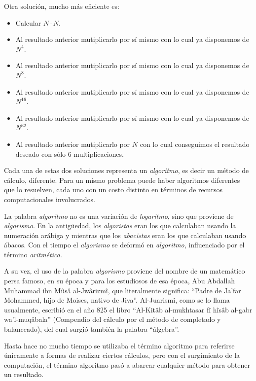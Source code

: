 Otra solución, mucho más eficiente es:
\begin{itemize}[noitemsep]
\item Calcular $N \cdot N$.

\item Al resultado anterior mutiplicarlo por sí mismo con lo cual
ya disponemos de $N^{4}$.

\item Al resultado anterior mutiplicarlo por sí mismo con lo cual
ya disponemos de $N^{8}$.

\item Al resultado anterior mutiplicarlo por sí mismo con lo cual
ya disponemos de $N^{16}$.

\item Al resultado anterior mutiplicarlo por sí mismo con lo cual
ya disponemos de $N^{32}$.

\item Al resultado anterior mutiplicarlo por $N$ con lo cual
conseguimos el resultado deseado con sólo 6 multiplicaciones.

\end{itemize}

Cada una de estas dos soluciones representa un \emph{algoritmo}, es
decir un método de cálculo, diferente. Para un mismo problema
puede haber algoritmos diferentes que lo resuelven, cada uno con
un costo distinto en términos de recursos computacionales
involucrados.

\begin{sabias_que}
La palabra \textit{algoritmo} no es una variación de \textit{logaritmo},
sino que proviene de \textit{algorismo}. En la antigüedad, los
\textit{algoristas} eran los que calculaban usando la numeración arábiga y
mientras que los \textit{abacistas} eran los que calculaban usando ábacos.
Con el tiempo el \textit{algorismo} se deformó en \textit{algoritmo},
influenciado por el término \textit{aritmética}.

A su vez, el uso de la palabra \textit{algorismo} proviene del nombre de un
matemático persa famoso, en su época y para los estudiosos de esa época,
Abu Abdallah Muhammad ibn Mûsâ al-Jwârizmî, que literalmente significa:
\enquote{Padre de Ja'far Mohammed, hijo de Moises, nativo de Jiva}. Al-Juarismi,
como se lo llama usualmente, escribió en el año 825 el libro \enquote{Al-Kitâb
al-mukhtasar fî hîsâb al-gabr wa'l-muqâbala} (Compendio del cálculo por el
método de completado y balanceado), del cual surgió también la palabra
\enquote{álgebra}.

Hasta hace no mucho tiempo se utilizaba el término algoritmo para referirse
únicamente a formas de realizar ciertos cálculos, pero con el surgimiento
de la computación, el término algoritmo pasó a abarcar cualquier método
para obtener un resultado.
\end{sabias_que}

